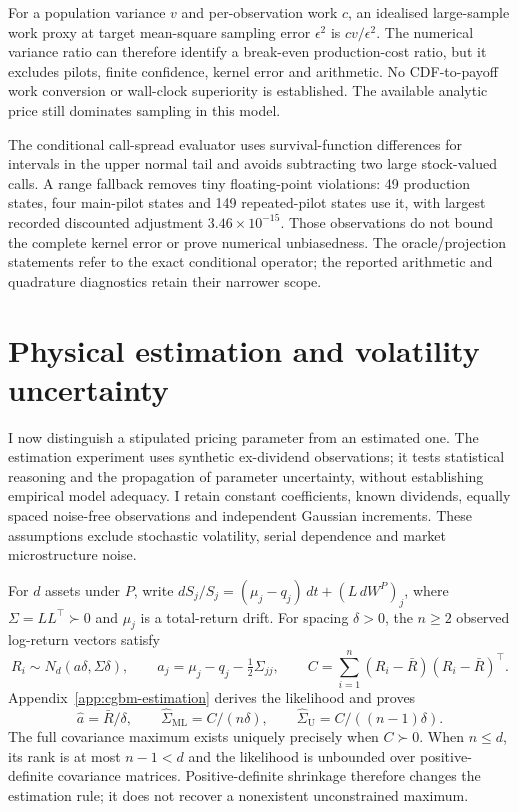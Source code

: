 \documentclass[11pt]{article}
\begin{document}
For a population variance $v$ and per-observation work $c$, an idealised
large-sample work proxy at target mean-square sampling error $\epsilon^2$
is $cv/\epsilon^2$. The numerical variance ratio can therefore identify a
break-even production-cost ratio, but it excludes pilots, finite confidence,
kernel error and arithmetic. No CDF-to-payoff work conversion or wall-clock
superiority is established. The available analytic price still dominates
sampling in this model.

The conditional call-spread evaluator uses survival-function differences
for intervals in the upper normal tail and avoids subtracting two large
stock-valued calls. A range fallback removes tiny floating-point violations:
49 production states, four main-pilot states and 149 repeated-pilot states
use it, with largest recorded discounted adjustment
$3.46\times10^{-15}$. Those observations do not bound the complete kernel
error or prove numerical unbiasedness. The oracle/projection statements
refer to the exact conditional operator; the reported arithmetic and
quadrature diagnostics retain their narrower scope.

\section{Physical estimation and volatility uncertainty}
\label{sec:cgbm-estimation}

I now distinguish a stipulated pricing parameter from an estimated one.
The estimation experiment uses synthetic ex-dividend observations;
it tests statistical reasoning and the propagation of parameter uncertainty,
without establishing empirical model adequacy. I retain constant coefficients,
known dividends, equally spaced noise-free observations and independent
Gaussian increments. These assumptions exclude stochastic volatility,
serial dependence and market microstructure noise.

For $d$ assets under $P$, write
$dS_j/S_j=(\mu_j-q_j)\,dt+(L\,dW^P)_j$, where
$\Sigma=LL^\top\succ0$ and $\mu_j$ is a total-return drift. For spacing
$\delta>0$, the $n\geq2$ observed log-return vectors satisfy
\begin{equation}
 R_i\sim N_d(a\delta,\Sigma\delta),\qquad
 a_j=\mu_j-q_j-\tfrac12\Sigma_{jj},\qquad
 C=\sum_{i=1}^n(R_i-\bar R)(R_i-\bar R)^\top.
 \label{eq:cgbm-statistical-model}
\end{equation}
Appendix~\ref{app:cgbm-estimation} derives the likelihood and proves
\begin{equation}
 \widehat a=\bar R/\delta,\qquad
 \widehat\Sigma_{\mathrm{ML}}=C/(n\delta),\qquad
 \widehat\Sigma_{\mathrm U}=C/((n-1)\delta).
 \label{eq:cgbm-covariance-estimators}
\end{equation}
The full covariance maximum exists uniquely precisely when $C\succ0$.
When $n\leq d$, its rank is at most $n-1<d$ and the likelihood is
unbounded over positive-definite covariance matrices. Positive-definite
shrinkage therefore changes the estimation rule; it does not recover
a nonexistent unconstrained maximum.
\end{document}
